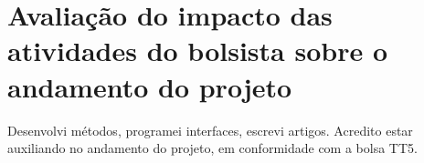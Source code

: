 \documentclass[a4paper, 11pt]{article}
\begin{document}


\section{Avaliação do impacto das atividades do bolsista sobre o andamento do projeto}
Desenvolvi métodos, programei interfaces, escrevi artigos.
Acredito estar auxiliando no andamento do projeto, em conformidade com a bolsa TT5.
\end{document}
